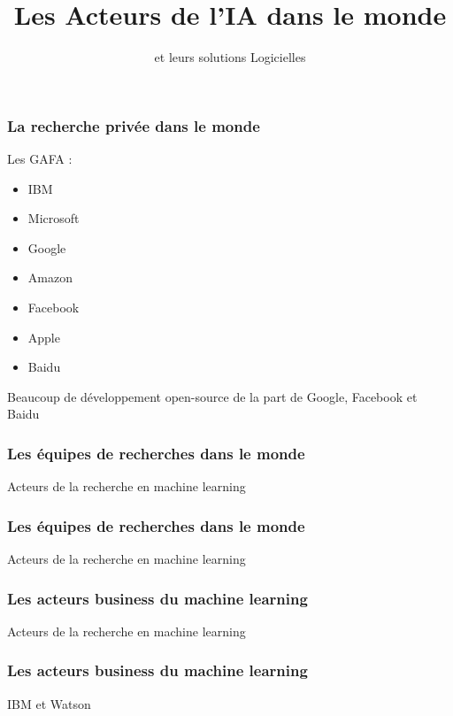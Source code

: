 \documentclass{formation}
\title{Les Acteurs de l'IA dans le monde}
\subtitle{et leurs solutions Logicielles}
\begin{document}
\maketitle

\begin{frame}
  \frametitle{La recherche privée dans le monde}
  Les GAFA :
  \begin{itemize}
  \item IBM
  \item Microsoft
  \item Google
  \item Amazon
  \item Facebook
  \item Apple
  \item Baidu
  \end{itemize}
  Beaucoup de développement open-source de la part de Google, Facebook et Baidu
\end{frame}

\begin{frame}
  \frametitle{Les équipes de recherches dans le monde}
  Acteurs de la recherche en machine learning
\end{frame}

\begin{frame}
  \frametitle{Les équipes de recherches dans le monde}
  Acteurs de la recherche en machine learning
\end{frame}

\begin{frame}
  \frametitle{Les acteurs business du machine learning}
  Acteurs de la recherche en machine learning
\end{frame}

\begin{frame}
  \frametitle{Les acteurs business du machine learning}
  IBM et Watson
\end{frame}
\end{document}
